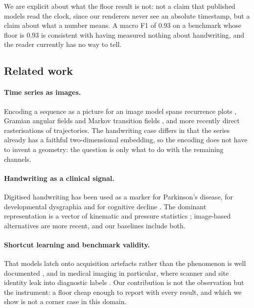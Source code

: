 \documentclass[10pt,a4paper]{article}
\begin{document}
We are explicit about what the floor result is not: not a claim that published models read the
clock, since our renderers never see an absolute timestamp, but a claim about what a number means.
A macro F1 of $0.93$ on a benchmark whose floor is $0.93$ is consistent with having measured nothing
about handwriting, and the reader currently has no way to tell.

\subsection{Related work}
\label{sec:related}


\paragraph{Time series as images.} Encoding a sequence as a picture for an image model spans
recurrence plots \citep{eckmann1987recurrence}, Gramian angular fields and
Markov transition fields \citep{wang2015gaf}, and more recently direct rasterisations of
trajectories. The handwriting case differs in that the series already has a faithful
two-dimensional embedding, so the encoding does not have to invent a geometry: the question is only
what to do with the remaining channels.

\paragraph{Handwriting as a clinical signal.} Digitised handwriting has been used as a marker for
Parkinson's disease, for developmental dysgraphia and for cognitive decline
\citep{werner2006handwriting}. The dominant representation is a vector of kinematic and pressure
statistics \citep{drotar2016pahaw,drotar2020dysgraphia}; image-based alternatives are more recent,
and our baselines include both.

\paragraph{Shortcut learning and benchmark validity.} That models latch onto acquisition artefacts
rather than the phenomenon is well documented \citep{geirhos2020shortcut}, and in medical imaging
in particular, where scanner and site identity leak into diagnostic labels
\citep{degrave2021shortcut}. Our contribution is not the observation but the instrument: a floor
cheap enough to report with every result, and which we show is not a corner case in this domain.
\end{document}
